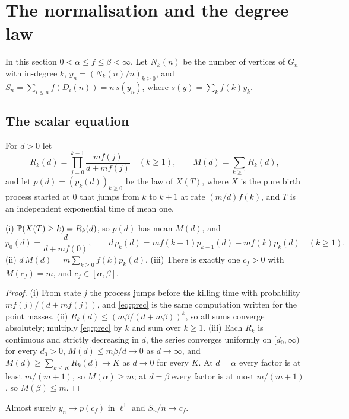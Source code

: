 \section{The normalisation and the degree law}\label{sec:normal}

In this section $0<\alpha\le f\le\beta<\infty$. Let $N_k(n)$ be the number of vertices of $G_n$ with in-degree $k$,
$y_n=(N_k(n)/n)_{k\ge0}$, and $S_n=\sum_{i\le n}f(D_i(n))=n\,s(y_n)$, where $s(y)=\sum_kf(k)y_k$.

\subsection{The scalar equation}

For $d>0$ let
\[
  R_k(d)=\prod_{j=0}^{k-1}\frac{mf(j)}{d+mf(j)}\quad(k\ge1),\qquad M(d)=\sum_{k\ge1}R_k(d),
\]
and let $p(d)=(p_k(d))_{k\ge0}$ be the law of $X(T)$, where $X$ is the pure birth process started at $0$ that
jumps from $k$ to $k+1$ at rate $(m/d)f(k)$, and $T$ is an independent exponential time of mean one.

\begin{lemma}\label{lem:scalar}
\textup{(i)} $\mathbb{P}(X(T)\ge k)=R_k(d)$, so $p(d)$ has mean $M(d)$, and
\begin{equation}\label{eq:prec}
  p_0(d)=\frac{d}{d+mf(0)},\qquad d\,p_k(d)=mf(k-1)p_{k-1}(d)-mf(k)p_k(d)\quad(k\ge1).
\end{equation}
\textup{(ii)} $d\,M(d)=m\sum_{k\ge0}f(k)p_k(d)$.
\textup{(iii)} There is exactly one $c_f>0$ with $M(c_f)=m$, and $c_f\in[\alpha,\beta]$.
\end{lemma}

\begin{proof}
(i) From state $j$ the process jumps before the killing time with probability $mf(j)/(d+mf(j))$, and
\eqref{eq:prec} is the same computation written for the point masses. (ii) $R_k(d)\le(m\beta/(d+m\beta))^k$, so all
sums converge absolutely; multiply \eqref{eq:prec} by $k$ and sum over $k\ge1$. (iii) Each $R_k$ is continuous and
strictly decreasing in $d$, the series converges uniformly on $[d_0,\infty)$ for every $d_0>0$,
$M(d)\le m\beta/d\to0$ as $d\to\infty$, and $M(d)\ge\sum_{k\le K}R_k(d)\to K$ as $d\to0$ for every $K$. At
$d=\alpha$ every factor is at least $m/(m+1)$, so $M(\alpha)\ge m$; at $d=\beta$ every factor is at most $m/(m+1)$,
so $M(\beta)\le m$.
\end{proof}

\begin{theorem}\label{thm:normal}
Almost surely $y_n\to p(c_f)$ in $\ell^1$ and $S_n/n\to c_f$.
\end{theorem}

